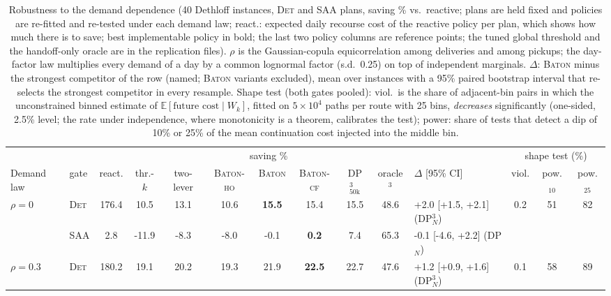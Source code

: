 \begin{table}
\caption{Robustness to the demand dependence (40 Dethloff instances,
\textsc{Det} and \textsc{SAA} plans, saving \% vs.\ reactive; plans are
held fixed and policies are re-fitted and re-tested under each demand
law; react.: expected daily recourse cost of the reactive policy per
plan, which shows how much there is to save; best implementable policy
in bold; the last two policy columns are reference points; the tuned
global threshold and the handoff-only oracle are in the replication
files). $\rho$ is
the Gaussian-copula equicorrelation among deliveries and among pickups;
the day-factor law multiplies every demand of a day by a common
lognormal factor (s.d.\ 0.25) on top of independent marginals.
$\Delta$: \textsc{Baton} minus the strongest competitor of the row
(named; \textsc{Baton} variants excluded), mean over instances with a
95\% paired bootstrap interval that re-selects the strongest competitor
in every resample. Shape test (both gates pooled): viol.\ is
the share of adjacent-bin pairs in which the unconstrained binned
estimate of $\mathbb E[\text{future cost} \mid W_k]$, fitted on
$5\times10^4$ paths per route with 25 bins, \emph{decreases}
significantly (one-sided, 2.5\% level; the rate under independence,
where monotonicity is a theorem, calibrates the test); power: share of
tests that detect a dip of 10\% or 25\% of the mean continuation cost
injected into the middle bin.}
\label{tab:dependence}
\centering
\footnotesize
\setlength{\tabcolsep}{3pt}
\begin{adjustbox}{max width=\linewidth}
\begin{tabular}{l l c ccccccc l ccc}
\toprule
& & & \multicolumn{7}{c}{saving \%} & & \multicolumn{3}{c}{shape test (\%)} \\ \cmidrule(lr){4-10}\cmidrule(lr){12-14}
Demand law & gate & react. & thr.-$k$ & two-lever & \textsc{Baton-ho} & \textsc{Baton} & \textsc{Baton-cf} & DP$^3_{50\mathrm{k}}$ & oracle$^3$ & $\Delta$ [95\% CI] & viol. & pow.$_{10}$ & pow.$_{25}$ \\
\midrule
$\rho = 0$ & \textsc{Det} & 176.4 & 10.5 & 13.1 & 10.6 & \textbf{15.5} & 15.4 & 15.5 & 48.6 & +2.0 [+1.5, +2.1] (DP$^3_N$) & 0.2 & 51 & 82 \\
 & \textsc{SAA} & 2.8 & -11.9 & -8.3 & -8.0 & -0.1 & \textbf{0.2} & 7.4 & 65.3 & -0.1 [-4.6, +2.2] (DP$_N$) & & & \\
$\rho = 0.3$ & \textsc{Det} & 180.2 & 19.1 & 20.2 & 19.3 & 21.9 & \textbf{22.5} & 22.7 & 47.6 & +1.2 [+0.9, +1.6] (DP$^3_N$) & 0.1 & 58 & 89 \\

\end{tabular}
\end{adjustbox}
\end{table}
